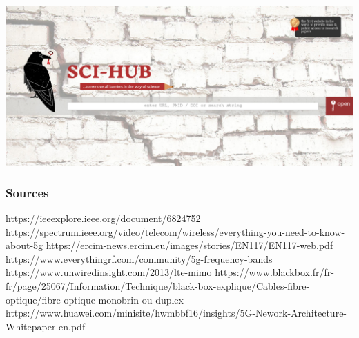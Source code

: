 \documentclass{beamer}
\begin{document}
    \begin{frame}
        \frametitle{}
        \includegraphics[width=\linewidth]{img/sci-hub.jpg}
    \end{frame}

    \begin{frame}
        \frametitle{Sources}
        https://ieeexplore.ieee.org/document/6824752
        https://spectrum.ieee.org/video/telecom/wireless/everything-you-need-to-know-about-5g
        https://ercim-news.ercim.eu/images/stories/EN117/EN117-web.pdf
        https://www.everythingrf.com/community/5g-frequency-bands
        https://www.unwiredinsight.com/2013/lte-mimo
        https://www.blackbox.fr/fr-fr/page/25067/Information/Technique/black-box-explique/Cables-fibre-optique/fibre-optique-monobrin-ou-duplex
        https://www.huawei.com/minisite/hwmbbf16/insights/5G-Nework-Architecture-Whitepaper-en.pdf
    \end{frame}
\end{document}
